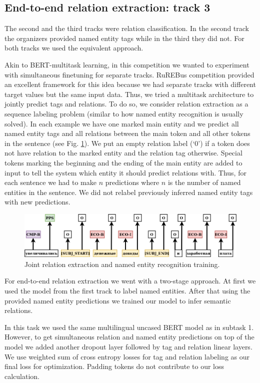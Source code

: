 \documentclass{dialogue}
\begin{document}
	\subsection{End-to-end relation extraction: track 3}
	The second and the third tracks were relation classification. In the second track the organizers provided named entity tags while in the third they did not. For both tracks we used the equivalent approach.
	
	Akin to BERT-multitask learning, in this competition we wanted to experiment with simultaneous finetuning for separate tracks. RuREBus competition provided an excellent framework for this idea because we had separate tracks with different target values but the same input data. Thus, we tried a multitask architecture to jointly predict tags and relations. To do so, we consider relation extraction as a sequence labeling problem (similar to how named entity recognition is usually solved). In each example we have one marked main entity and we predict all named entity tags and all relations between the main token and all other tokens in the sentence (see Fig. \ref{fig:rel}). We put an empty relation label (‘0’) if a token does not have relation to the marked entity and the relation tag otherwise. Special tokens marking the beginning and the ending of the main entity are added to input to tell the system which entity it should predict relations with. Thus, for each sentence we had to make $n$ predictions where $n$ is the number of named entities in the sentence. We did not relabel previously inferred named entity tags with new predictions.
	
	
	\begin{figure}[thb]
		\centering
		\includegraphics[scale=0.5]{pics/rel2}
		\caption{Joint relation extraction and named entity recognition training.}
		\label{fig:rel}
	\end{figure}
	
	
	For end-to-end relation extraction we went with a two-stage approach. At first we used the model from the first track to label named entities. After that using the provided named entity predictions we trained our model to infer semantic relations.
	
	In this task we used the same multilingual uncased BERT model as in subtask 1. However, to get simultaneous relation and named entity predictions on top of the model we added another dropout layer followed by tag and relation linear layers. We use weighted sum of cross entropy losses for tag and relation labeling as our final loss for optimization. Padding tokens do not contribute to our loss calculation.
	
\end{document}
